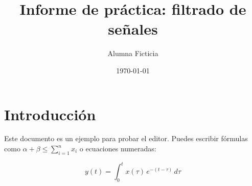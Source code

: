 \documentclass[11pt]{article}
\title{Informe de práctica: filtrado de señales}
\author{Alumna Ficticia}
\date{\today}
\begin{document}
\maketitle

\section{Introducción}
Este documento es un ejemplo para probar el editor. Puedes escribir fórmulas como
$\alpha + \beta \leq \sum_{i=1}^{n} x_i$ o ecuaciones numeradas:

\begin{equation}
  y(t) = \int_{0}^{t} x(\tau)\, e^{-(t-\tau)}\, d\tau
\end{equation}





\end{document}
